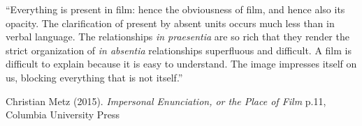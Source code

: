 \documentclass[a4paper,landscape,headrule,footrule,xetex]{foils}
\begin{document}
\begin{itemize}
\begin{itemize}
\begin{itemize}
\end{itemize}
\end{itemize}

\begin{quotation}
  
\end{quotation}
“Everything is present in film: hence the
obviousness of film, and hence also its opacity.
The clarification of present by absent units
occurs much less than in verbal language. The
relationships \textit{in praesentia} are so rich that
they render the strict organization of \textit{in
absentia} relationships superfluous and
difficult. A film is difficult to explain because it
is easy to understand. The image impresses
itself on us, blocking everything that is not
itself.”
\end{itemize}
Christian Metz (2015). \textit{Impersonal Enunciation, or the Place of Film} p.11, Columbia University Press
\end{document}

